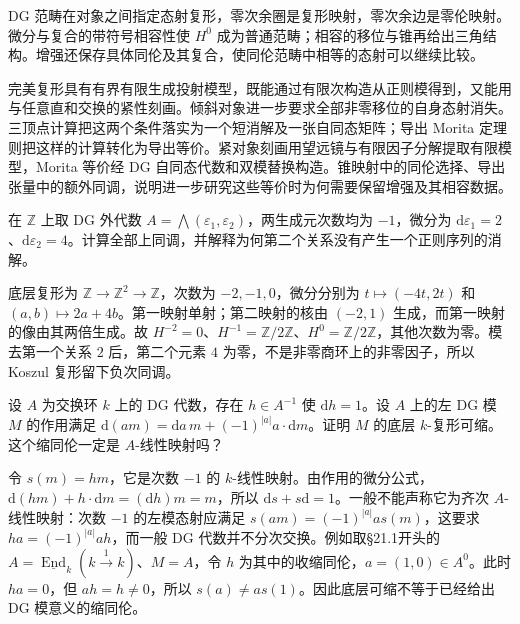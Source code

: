 




\begin{chaptersummary}
	DG 范畴在对象之间指定态射复形，零次余圈是复形映射，零次余边是零伦映射。微分与复合的带符号相容性使 \(H^0\) 成为普通范畴；相容的移位与锥再给出三角结构。增强还保存具体同伦及其复合，使同伦范畴中相等的态射可以继续比较。

	\ProseParagraphBreak
	完美复形具有有界有限生成投射模型，既能通过有限次构造从正则模得到，又能用与任意直和交换的紧性刻画。倾斜对象进一步要求全部非零移位的自身态射消失。三顶点计算把这两个条件落实为一个短消解及一张自同态矩阵；导出 Morita 定理则把这样的计算转化为导出等价。紧对象刻画用望远镜与有限因子分解提取有限模型，Morita 等价经 DG 自同态代数和双模替换构造。锥映射中的同伦选择、导出张量中的额外同调，说明进一步研究这些等价时为何需要保留增强及其相容数据。
\end{chaptersummary}

\BookExercises

\begin{optionalexercise}\label{b4:ex:20-koszul-dependent-relations}
	在 \(\mathbb Z\) 上取 DG 外代数 \(A=\bigwedge(\varepsilon_1,\varepsilon_2)\)，两生成元次数均为 \(-1\)，微分为 \(\mathrm{d}\varepsilon_1=2\)、\(\mathrm{d}\varepsilon_2=4\)。计算全部上同调，并解释为何第二个关系没有产生一个正则序列的消解。
\end{optionalexercise}
\begin{solution}
	底层复形为 \(\mathbb Z\to\mathbb Z^2\to\mathbb Z\)，次数为 \(-2,-1,0\)，微分分别为 \(t\mapsto(-4t,2t)\) 和 \((a,b)\mapsto2a+4b\)。第一映射单射；第二映射的核由 \((-2,1)\) 生成，而第一映射的像由其两倍生成。故 \(H^{-2}=0\)、\(H^{-1}=\mathbb Z/2\mathbb Z\)、\(H^0=\mathbb Z/2\mathbb Z\)，其他次数为零。模去第一个关系 \(2\) 后，第二个元素 \(4\) 为零，不是非零商环上的非零因子，所以 Koszul 复形留下负次同调。
\end{solution}

\begin{optionalexercise}\label{b4:ex:20-unit-boundary-contractibility}
	设 \(A\) 为交换环 \(k\) 上的 DG 代数，存在 \(h\in A^{-1}\) 使 \(\mathrm{d}h=1\)。设 \(A\) 上的左 DG 模 \(M\) 的作用满足 \(\mathrm{d}(am)=\mathrm{d}a\,m+(-1)^{|a|}a\cdot\mathrm{d}m\)。证明 \(M\) 的底层 \(k\)-复形可缩。这个缩同伦一定是 \(A\)-线性映射吗？
\end{optionalexercise}
\begin{solution}
	令 \(s(m)=hm\)，它是次数 \(-1\) 的 \(k\)-线性映射。由作用的微分公式，\(\mathrm{d}(hm)+h\cdot\mathrm{d}m=(\mathrm{d}h)m=m\)，所以 \(\mathrm{d}s+s\mathrm{d}=1\)。一般不能声称它为齐次 \(A\)-线性映射：次数 \(-1\) 的左模态射应满足 \(s(am)=(-1)^{|a|}a s(m)\)，这要求 \(ha=(-1)^{|a|}ah\)，而一般 DG 代数并不分次交换。例如取§21.1开头的 \(A=\underline{\operatorname{End}}_k(k\xrightarrow{1}k)\)、\(M=A\)，令 \(h\) 为其中的收缩同伦，\(a=(1,0)\in A^0\)。此时 \(ha=0\)，但 \(ah=h\ne0\)，所以 \(s(a)\ne a s(1)\)。因此底层可缩不等于已经给出 DG 模意义的缩同伦。
\end{solution}

